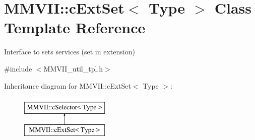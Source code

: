 \hypertarget{classMMVII_1_1cExtSet}{}\section{M\+M\+V\+II\+:\+:c\+Ext\+Set$<$ Type $>$ Class Template Reference}
\label{classMMVII_1_1cExtSet}


Interface to sets services (set in extension)  




{\ttfamily \#include $<$M\+M\+V\+I\+I\+\_\+util\+\_\+tpl.\+h$>$}

Inheritance diagram for M\+M\+V\+II\+:\+:c\+Ext\+Set$<$ Type $>$\+:\begin{figure}[H]
\begin{center}
\leavevmode
\includegraphics[height=2.000000cm]{classMMVII_1_1cExtSet}
\end{center}
\end{figure}
